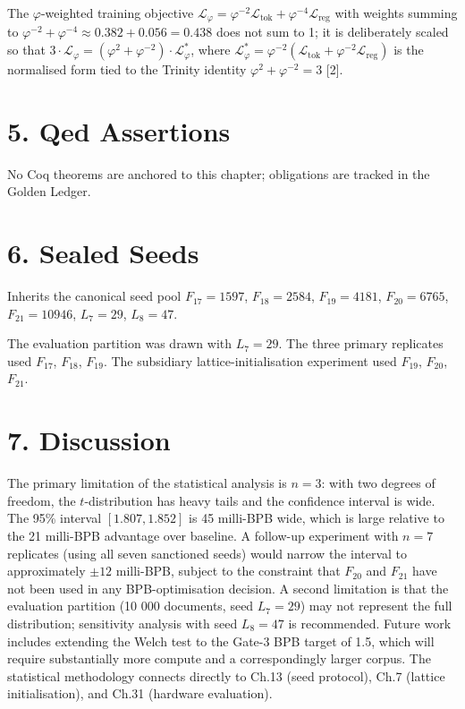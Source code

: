 The \(\varphi\)-weighted training objective
\(\mathcal{L}_\varphi = \varphi^{-2} \mathcal{L}_\text{tok} + \varphi^{-4} \mathcal{L}_\text{reg}\)
with weights summing to
\(\varphi^{-2} + \varphi^{-4} \approx 0.382 + 0.056 = 0.438\)
does not sum to 1; it is deliberately scaled so
that
\(3 \cdot \mathcal{L}_\varphi = (\varphi^2 + \varphi^{-2}) \cdot \mathcal{L}_\varphi^*\),
where
\(\mathcal{L}_\varphi^* = \varphi^{-2}(\mathcal{L}_\text{tok} + \varphi^{-2}\mathcal{L}_\text{reg})\)
is the normalised form tied to the Trinity
identity \(\varphi^2 + \varphi^{-2} = 3\) [2].

\section{5. Qed
Assertions}\label{fa_19:qed-assertions}

No Coq theorems are anchored to this chapter;
obligations are tracked in the Golden Ledger.

\section{6. Sealed Seeds}\label{fa_19:sealed-seeds}

Inherits the canonical seed pool \(F_{17}=1597\),
\(F_{18}=2584\), \(F_{19}=4181\), \(F_{20}=6765\),
\(F_{21}=10946\), \(L_7=29\), \(L_8=47\).

The evaluation partition was drawn with
\(L_7 = 29\). The three primary replicates used
\(F_{17}\), \(F_{18}\), \(F_{19}\). The subsidiary
lattice-initialisation experiment used \(F_{19}\),
\(F_{20}\), \(F_{21}\).

\section{7. Discussion}\label{fa_19:discussion}

The primary limitation of the statistical analysis
is \(n = 3\): with two degrees of freedom, the
\(t\)-distribution has heavy tails and the
confidence interval is wide. The 95\% interval
\([1.807, 1.852]\) is 45 milli-BPB wide, which is
large relative to the 21 milli-BPB advantage over
baseline. A follow-up experiment with \(n = 7\)
replicates (using all seven sanctioned seeds)
would narrow the interval to approximately
\(\pm 12\) milli-BPB, subject to the constraint
that \(F_{20}\) and \(F_{21}\) have not been used
in any BPB-optimisation decision. A second
limitation is that the evaluation partition (10
000 documents, seed \(L_7 = 29\)) may not
represent the full distribution; sensitivity
analysis with seed \(L_8 = 47\) is recommended.
Future work includes extending the Welch test to
the Gate-3 BPB target of 1.5, which will require
substantially more compute and a correspondingly
larger corpus. The statistical methodology
connects directly to Ch.13 (seed protocol), Ch.7
(lattice initialisation), and Ch.31 (hardware
evaluation).

